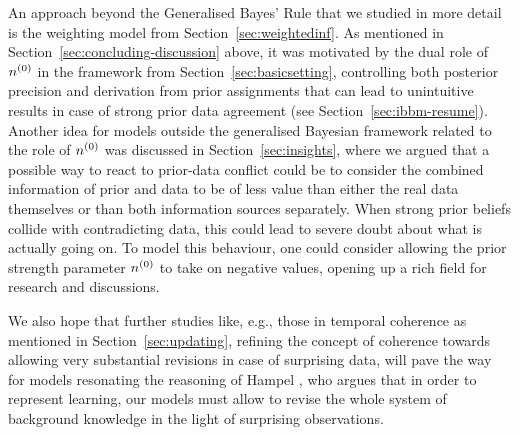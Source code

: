An approach beyond the Generalised Bayes' Rule that we studied in more detail
is the weighting model from Section~\ref{sec:weightedinf}.
As mentioned in Section~\ref{sec:concluding-discussion} above,
it was motivated by the dual role of $n^{(0)}$ in the framework from Section~\ref{sec:basicsetting},
controlling both posterior precision and derivation from prior assignments
that can lead to unintuitive results in case of strong prior data agreement (see Section~\ref{sec:ibbm-resume}).
Another idea for models outside the generalised Bayesian framework
related to the role of $n^{(0)}$ was discussed in Section~\ref{sec:insights},
where we argued that a possible way to react to prior-data
conflict could be to consider the combined information of prior and data
to be of less value than either the real data themselves
or than both information sources separately.
When strong prior beliefs collide with contradicting data,
this could lead to severe doubt about what is actually going on.
To model this behaviour, one could consider allowing the prior strength parameter $n^{(0)}$
to take on negative values, opening up a rich field for research and discussions.


We also hope that further studies like, e.g., those in temporal coherence as mentioned in Section~\ref{sec:updating},
refining the concept of coherence towards allowing very substantial revisions in case of surprising data, %
will pave the way for models resonating the %
reasoning of Hampel \parencite*{2009:hampel:knowledge,2011:hampel},
who argues that in order to represent learning,
our models must allow to revise 
the whole system of background knowledge 
in the light of surprising observations.











